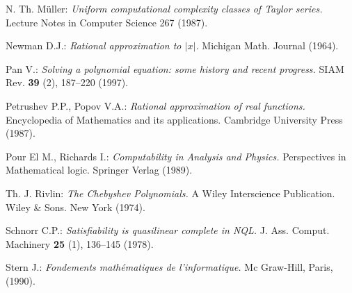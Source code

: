 \begin{thebibliography}{50}
 N. Th. Müller: {\em Uniform computational complexity 
classes of Taylor series.}
Lecture Notes in Computer Science 267 (1987).

 Newman D.J.: {\em Rational approximation to $\vert x\vert$.}
 Michigan Math. Journal (1964).

 Pan V.: {\em Solving a polynomial equation: some history and recent progress.}
SIAM Rev.  {\bf 39}  (2), 187--220 (1997).

 Petrushev P.P., Popov V.A.: {\em Rational approximation of real functions.} Encyclopedia of Mathematics and its applications. Cambridge University Press (1987).

 Pour El M., Richards I.: {\em Computability in Analysis and 
Physics.} Perspectives in Mathematical logic. Springer Verlag (1989).

 Th. J. Rivlin: {\em The Chebyshev Polynomials.}
A Wiley Interscience Publication. Wiley \& Sons. New York (1974). 

 Schnorr C.P.: {\em Satisfiability is quasilinear complete in NQL.}
J. Ass. Comput. Machinery {\bf 25} (1), 136--145 (1978).

 Stern J.: {\em Fondements mathématiques de l'informatique.}
Mc Graw-Hill, Paris, (1990).


\end{thebibliography}






